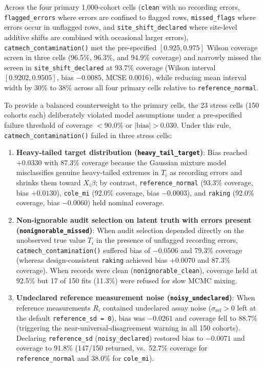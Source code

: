 \documentclass[
]{article}
\providecommand{\tightlist}{%
  \setlength{\itemsep}{0pt}\setlength{\parskip}{0pt}}
\begin{document}
Across the four primary 1,000-cohort cells (\texttt{clean} with no
recording errors, \texttt{flagged\_errors} where errors are confined to
flagged rows, \texttt{missed\_flags} where errors occur in unflagged
rows, and \texttt{site\_shift\_declared} where site-level additive
shifts are combined with occasional larger errors),
\texttt{catmech\_contamination()} met the pre-specified
\([0.925, 0.975]\) Wilson coverage screen in three cells (96.5\%,
96.3\%, and 94.9\% coverage) and narrowly missed the screen in
\texttt{site\_shift\_declared} at 93.7\% coverage (Wilson interval
\([0.9202, 0.9505]\), bias \(-0.0085\), MCSE 0.0016), while reducing
mean interval width by 30\% to 38\% across all four primary cells
relative to \texttt{reference\_normal}.

To provide a balanced counterweight to the primary cells, the 23 stress
cells (150 cohorts each) deliberately violated model assumptions under a
pre-specified failure threshold of coverage \(< 90.0\%\) or
\(|\text{bias}| > 0.030\). Under this rule,
\texttt{catmech\_contamination()} failed in three stress cells:

\begin{enumerate}
\def\labelenumi{\arabic{enumi}.}
\tightlist
\item
  \textbf{Heavy-tailed target distribution
  (\texttt{heavy\_tail\_target})}: Bias reached \(+0.0330\) with 87.3\%
  coverage because the Gaussian mixture model misclassifies genuine
  heavy-tailed extremes in \(T_i\) as recording errors and shrinks them
  toward \(X_i \beta\); by contrast, \texttt{reference\_normal} (93.3\%
  coverage, bias \(+0.0130\)), \texttt{cole\_mi} (92.0\% coverage, bias
  \(-0.0003\)), and \texttt{raking} (92.0\% coverage, bias \(-0.0060\))
  held nominal coverage.
\item
  \textbf{Non-ignorable audit selection on latent truth with errors
  present (\texttt{nonignorable\_missed})}: When audit selection
  depended directly on the unobserved true value \(T_i\) in the presence
  of unflagged recording errors, \texttt{catmech\_contamination()}
  suffered bias of \(-0.0506\) and 79.3\% coverage (whereas
  design-consistent \texttt{raking} achieved bias \(+0.0070\) and 87.3\%
  coverage). When records were clean (\texttt{nonignorable\_clean}),
  coverage held at 92.5\% but 17 of 150 fits (11.3\%) were refused for
  slow MCMC mixing.
\item
  \textbf{Undeclared reference measurement noise
  (\texttt{noisy\_undeclared})}: When reference measurements \(R_i\)
  contained undeclared assay noise (\(\sigma_{\text{ref}} > 0\) left at
  the default \texttt{reference\_sd\ =\ 0}), bias was \(-0.0261\) and
  coverage fell to 88.7\% (triggering the near-universal-disagreement
  warning in all 150 cohorts). Declaring \texttt{reference\_sd}
  (\texttt{noisy\_declared}) restored bias to \(-0.0071\) and coverage
  to 91.8\% (147/150 returned, vs.~52.7\% coverage for
  \texttt{reference\_normal} and 38.0\% for \texttt{cole\_mi}).
\end{enumerate}
\end{document}
